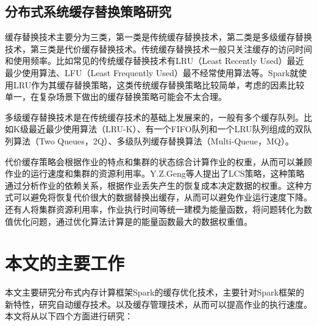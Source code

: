 \subsection{分布式系统缓存替换策略研究}

缓存替换技术主要分为三类，第一类是传统缓存替换技术，第二类是多级缓存替换技术，第三类是代价缓存替换技术。传统缓存替换技术一般只关注缓存的访问时间和使用频率。比如常见的传统缓存替换技术有LRU（Least Recently Used）最近最少使用算法、LFU（Least Frequently Used）最不经常使用算法等。Spark就使用LRU作为其缓存替换策略，这类传统缓存替换策略比较简单，考虑的因素比较单一，在复杂场景下做出的缓存替换策略可能会不太合理。

多级缓存替换技术是在传统缓存技术的基础上发展来的，一般有多个缓存队列。比如K级最近最少使用算法（LRU-K）、有一个FIFO队列和一个LRU队列组成的双队列算法（Two Queues，2Q）、多级队列缓存替换算法（Multi-Queue，MQ）。

代价缓存策略会根据作业的特点和集群的状态综合计算作业的权重，从而可以兼顾作业的运行速度和集群的资源利用率。Y.Z.Geng等人提出了LCS策略，这种策略通过分析作业的依赖关系，根据作业丢失产生的恢复成本决定数据的权重。这种方式可以避免将恢复代价很大的数据替换出缓存，从而可以避免作业运行速度下降。还有人将集群资源利用率，作业执行时间等统一建模为能量函数，将问题转化为数值优化问题，通过优化算法计算是的能量函数最大的数据权重值。

\section{本文的主要工作}

本文主要研究分布式内存计算框架Spark的缓存优化技术，主要针对Spark框架的新特性，研究自动缓存技术。以及缓存管理技术，从而可以提高作业的执行速度。本文将从以下四个方面进行研究：

